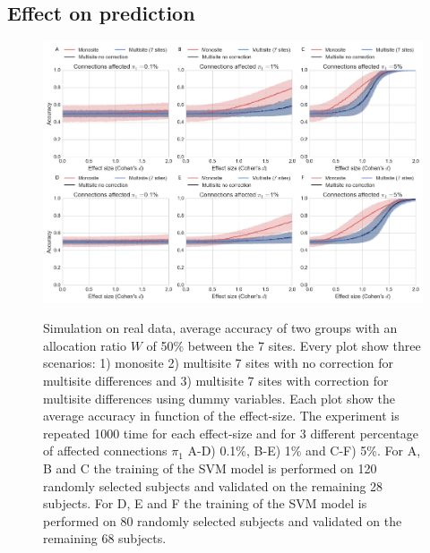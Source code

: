 \documentclass[authoryear]{elsarticle}
\begin{document}
\subsection{Effect on prediction}

\begin{figure}[tbp]
\centering
\captionsetup[subfloat]{labelformat=empty}
{\includegraphics[width=\textwidth]{../figures/prediction_effectsize.png}}
\caption{
Simulation on real data, average accuracy of two groups with an allocation ratio $W$ of 50\% between the 7 sites. Every plot show three scenarios: 1) monosite 2) multisite 7 sites with no correction for multisite differences and 3) multisite 7 sites with correction for multisite differences using dummy variables. Each plot show the average accuracy in function of the effect-size.  The experiment is repeated 1000 time for each effect-size and for 3 different percentage of affected connections $\pi_1$ A-D) 0.1\%, B-E) 1\% and C-F) 5\%. For A, B and C the training of the SVM model is performed on 120 randomly selected subjects and validated on the remaining 28 subjects. For D, E and F the training of the SVM model is performed on 80 randomly selected subjects and validated on the remaining 68 subjects. 
}
\label{fig_prediction_sampeffect}
\end{figure}
\end{document}
